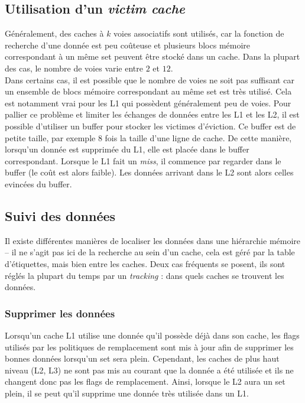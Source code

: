 \subsection{Utilisation d'un \textit{victim cache}}
Généralement, des caches à $k$ voies associatifs sont utilisés, car la fonction de recherche d'une donnée est peu coûteuse et plusieurs blocs mémoire correspondant à un même set peuvent être stocké dans un cache. Dans la plupart des cas, le nombre de voies varie entre $2$ et $12$. \\

Dans certains cas, il est possible que le nombre de voies ne soit pas suffisant car un ensemble de blocs mémoire correspondant au même set est très utilisé. Cela est notamment vrai pour les L1 qui possèdent généralement peu de voies. Pour pallier ce problème et limiter les échanges de données entre les L1 et les L2, il est possible d'utiliser un buffer pour stocker les victimes d'éviction. Ce buffer est de petite taille, par exemple $8$ fois la taille d'une ligne de cache. De cette manière, lorsqu'un donnée est supprimée du L1, elle est placée dans le buffer correspondant. Lorsque le L1 fait un \textit{miss}, il commence par regarder dans le buffer (le coût est alors faible). Les données arrivant dans le L2 sont alors celles evincées du buffer.

\subsection{Suivi des données}
 Il existe différentes manières de localiser les données dans une hiérarchie mémoire -- il ne s'agit pas ici de la recherche au sein d'un cache, cela est géré par la table d'étiquettes, mais bien entre les caches. Deux cas fréquents se posent, ils sont réglés la plupart du temps par un \textit{tracking} : dans quels caches se trouvent les données.

\subsubsection{Supprimer les données}
Lorsqu'un cache L1 utilise une donnée qu'il possède déjà dans son cache, les flags utilisés par les politiques de remplacement sont mis à jour afin de supprimer les bonnes données lorsqu'un set sera plein. Cependant, les caches de plus haut niveau (L2, L3) ne sont pas mis au courant que la donnée a été utilisée et ils ne changent donc pas les flags de remplacement. Ainsi, lorsque le L2 aura un set plein, il se peut qu'il supprime une donnée très utilisée dans un L1. \\

